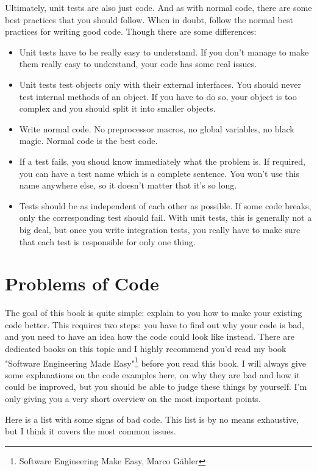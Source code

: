 Ultimately, unit tests are also just code. And as with normal code, there are some best practices that you should follow. When in doubt, follow the normal best practices for writing good code. Though there are some differences:
\begin{itemize}
    \item Unit tests have to be really easy to understand. If you don't manage to make them really easy to understand, your code has some real issues.
    \item Unit tests test objects only with their external interfaces. You should never test internal methods of an object. If you have to do so, your object is too complex and you should split it into smaller objects.
    \item Write normal code. No preprocessor macros, no global variables, no black magic. Normal code is the best code.
    \item If a test fails, you shoud know immediately what the problem is. If required, you can have a test name which is a complete sentence. You won't use this name anywhere else, so it doesn't matter that it's so long.
    \item Tests should be as independent of each other as possible. If some code breaks, only the corresponding test should fail. With unit tests, this is generally not a big deal, but once you write integration tests, you really have to make sure that each test is responsible for only one thing.
\end{itemize}


\chapter{Problems of Code}

The goal of this book is quite simple: explain to you how to make your existing code better. This requires two steps: you have to find out why your code is bad, and you need to have an idea how the code could look like instead. There are dedicated books on this topic and I highly recommend you'd read my book "Software Engineering Made Easy"\footnote{Software Engineering Make Easy, Marco Gähler} before you read this book. I will always give some explanations on the code examples here, on why they are bad and how it could be improved, but you should be able to judge these things by yourself. I'm only giving you a very short overview on the most important points.

Here is a list with some signs of bad code. This list is by no means exhaustive, but I think it covers the most common issues.

